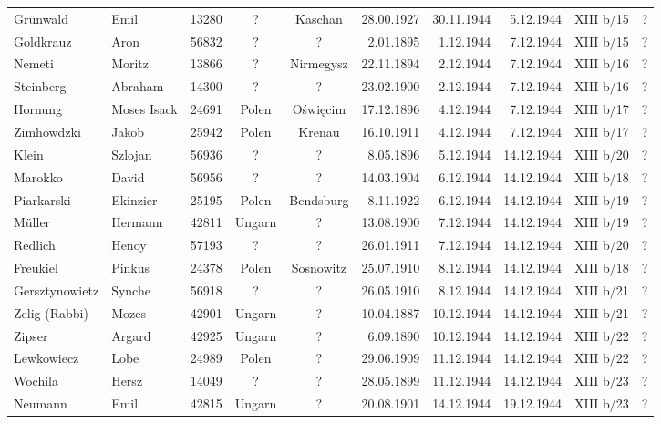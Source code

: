 \begin{tiny}
\begin{longtable}[l]{|l|l|r|c|c|r|r|r|c|r|}
Grünwald  &  Emil  & 13280 &  ?  &  Kaschan  & 28.00.1927 & 30.11.1944 & 5.12.1944 &  XIII b/15  &  ? \\[3pt]
Goldkrauz  &  Aron  & 56832 &  ?  &  ?  & 2.01.1895 & 1.12.1944 & 7.12.1944 &  XIII b/15  &  ? \\[3pt]
Nemeti  &  Moritz  & 13866 &  ?  &  Nirmegysz  & 22.11.1894 & 2.12.1944 & 7.12.1944 &  XIII b/16  &  ? \\[3pt]
Steinberg  &  Abraham  & 14300 &  ?  &  ?  & 23.02.1900 & 2.12.1944 & 7.12.1944 &  XIII b/16  &  ? \\[3pt]
Hornung  &  Moses Isack  & 24691 &  Polen  &  Oświęcim  & 17.12.1896 & 4.12.1944 & 7.12.1944 &  XIII b/17  &  ? \\[3pt]
Zimhowdzki  &  Jakob  & 25942 &  Polen  &  Krenau  & 16.10.1911 & 4.12.1944 & 7.12.1944 &  XIII b/17  &  ? \\[3pt]
Klein  &  Szlojan  & 56936 &  ?  &  ?  & 8.05.1896 & 5.12.1944 & 14.12.1944 &  XIII b/20  &  ? \\[3pt]
Marokko  &  David  & 56956 &  ?  &  ?  & 14.03.1904 & 6.12.1944 & 14.12.1944 &  XIII b/18  &  ? \\[3pt]
Piarkarski  &  Ekinzier  & 25195 &  Polen  &  Bendsburg  & 8.11.1922 & 6.12.1944 & 14.12.1944 &  XIII b/19  &  ? \\[3pt]
Müller  &  Hermann  & 42811 &  Ungarn  &  ?  & 13.08.1900 & 7.12.1944 & 14.12.1944 &  XIII b/19  &  ? \\[3pt]
Redlich  &  Henoy  & 57193 &  ?  &  ?  & 26.01.1911 & 7.12.1944 & 14.12.1944 &  XIII b/20  &  ? \\[3pt]
Freukiel  &  Pinkus  & 24378 &  Polen  &  Sosnowitz  & 25.07.1910 & 8.12.1944 & 14.12.1944 &  XIII b/18  &  ? \\[3pt]
Gersztynowietz  &  Synche  & 56918 &  ?  &  ?  & 26.05.1910 & 8.12.1944 & 14.12.1944 &  XIII b/21  &  ? \\[3pt]
Zelig (Rabbi)  &  Mozes  & 42901 &  Ungarn  &  ?  & 10.04.1887 & 10.12.1944 & 14.12.1944 &  XIII b/21  &  ? \\[3pt]
Zipser  &  Argard  & 42925 &  Ungarn  &  ?  & 6.09.1890 & 10.12.1944 & 14.12.1944 &  XIII b/22  &  ? \\[3pt]
Lewkowiecz  &  Lobe  & 24989 &  Polen  &  ?  & 29.06.1909 & 11.12.1944 & 14.12.1944 &  XIII b/22  &  ? \\[3pt]
Wochila  &  Hersz  & 14049 &  ?  &  ?  & 28.05.1899 & 11.12.1944 & 14.12.1944 &  XIII b/23  &  ? \\[3pt]
Neumann  &  Emil  & 42815 &  Ungarn  &  ?  & 20.08.1901 & 14.12.1944 & 19.12.1944 &  XIII b/23  &  ? \\[3pt]

\end{longtable}
\end{tiny}
